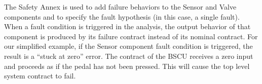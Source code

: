 The Safety Annex is used to add failure behaviors to the Sensor and Valve components and to specify the fault hypothesis (in this case, a single fault). 
When a fault condition is triggered in the analysis, the output behavior of that component is produced by its failure contract instead of its nominal contract.  For our simplified example, if the Sensor component fault condition is triggered, the result is a ``stuck at zero'' error. The contract of the BSCU receives a zero input and proceeds as if the pedal has not been pressed. This will cause the top level system contract to fail.

